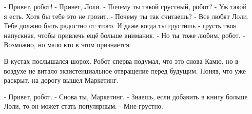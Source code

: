 - Привет, робот!
- Привет, Лоли.
- Почему ты такой грустный, робот?
- Уж такой я есть. Хотя бы тебе это не грозит.
- Почему ты так считаешь?
- Все любят Лоли. Тебе должно быть радостно от этого. И даже когда ты грустишь - грусть твоя напускная, чтобы привлечь ещё больше внимания.
- Но ты тоже любим, робот.
- Возможно, но мало кто в этом признается.

В кустах послышался шорох. Робот сперва подумал, что это снова Камю, но в воздухе не витало экзистенциальное отвращение перед будущим.
Поняв, что уже раскрыт, на дорогу вышел Маркетинг.

- Привет, робот.
- Снова ты, Маркетинг.
- Знаешь, если добавить в книгу больше Лоли, то он может стать популярным.
- Мне грустно.